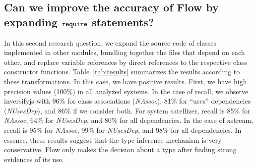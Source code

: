\documentclass[review]{elsarticle}
\newcommand{\aspas}[1]{{``#1''}}
\newcommand{\mcode}[1]{$\tt #1$}
\begin{document}

\begin{center}
	\noindent {}
\end{center}

\vspace{0.3cm}

\subsection {Can we improve the accuracy of Flow by expanding \mcode{require} statements?}
\label{sec:rq3}

In this second research question, we expand the source code of classes implemented in other modules, bundling together the files that depend on each other, and replace variable references by direct references to the respective class constructor functions. Table~\ref{tab:results} summarizes the results according to these transformations. In this case, we have positive results. First, we have high precision values (100\%) in all analyzed systems. In the case of recall, we observe {\sc inversifyjs} with 96\% for class associations (\textit{NAssoc}), 81\% for \aspas{uses} dependencies (\textit{NUsesDep}), and 86\% if we consider both. For system {\sc satellizer}, recall is 85\% for \textit{NAssoc}, 64\% for \textit{NUsesDep}, and 80\% for all dependencies. In the case of {\sc xstream}, recall is 95\% for \textit{NAssoc}, 99\% for \textit{NUsesDep}, and 98\% for all dependencies. In essence, these results suggest that the type inference mechanism is very conservative. Flow only makes the decision about a type after finding strong evidences of its use.

\end{document}

